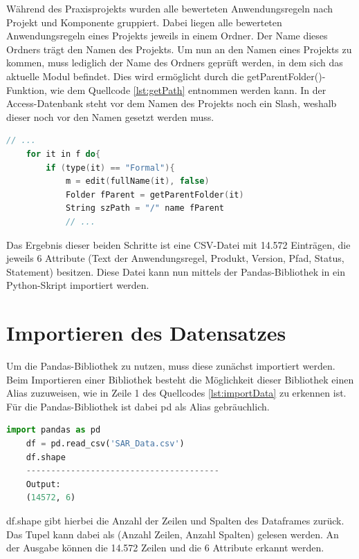 Während des Praxisprojekts wurden alle bewerteten Anwendungsregeln nach Projekt und Komponente gruppiert. Dabei liegen alle bewerteten Anwendungsregeln eines Projekts jeweils in einem Ordner.
Der Name dieses Ordners trägt den Namen des Projekts. Um nun an den Namen eines Projekts zu kommen, muss lediglich der Name des Ordners geprüft werden, in dem sich das aktuelle Modul befindet.
Dies wird ermöglicht durch die getParentFolder()-Funktion, wie dem Quellcode \ref*{lst:getPath} entnommen werden kann. In der Access-Datenbank steht vor dem Namen des Projekts noch ein 
Slash, weshalb dieser noch vor den Namen gesetzt werden muss.

\begin{lstlisting}[language = C++, caption={Projektnamen bestimmen},captionpos=b, label = lst:getPath, float, floatplacement=H]
    // ...
    for it in f do{
        if (type(it) == "Formal"){
            m = edit(fullName(it), false)
            Folder fParent = getParentFolder(it)
            String szPath = "/" name fParent
            // ...
\end{lstlisting}

Das Ergebnis dieser beiden Schritte ist eine CSV-Datei mit 14.572 Einträgen, die jeweils 6 Attribute (Text der Anwendungsregel, Produkt, Version, Pfad, Status, Statement) besitzen.
Diese Datei kann nun mittels der Pandas-Bibliothek in ein Python-Skript importiert werden.

\section{Importieren des Datensatzes}
Um die Pandas-Bibliothek zu nutzen, muss diese zunächst importiert werden. Beim Importieren einer Bibliothek besteht die Möglichkeit dieser Bibliothek einen Alias zuzuweisen,
wie in Zeile 1 des Quellcodes \ref*{lst:importData} zu erkennen ist. Für die Pandas-Bibliothek ist dabei pd als Alias gebräuchlich.

\begin{lstlisting}[language = python, caption={Pandas und den Datensatz importieren},captionpos=b, label = lst:importData, floatplacement=H]
    import pandas as pd
    df = pd.read_csv('SAR_Data.csv')
    df.shape
    ---------------------------------------
    Output:
    (14572, 6)
\end{lstlisting}

df.shape gibt hierbei die Anzahl der Zeilen und Spalten des Dataframes zurück. Das Tupel kann dabei als (Anzahl Zeilen, Anzahl Spalten) gelesen werden.
An der Ausgabe können die 14.572 Zeilen und die 6 Attribute erkannt werden.


